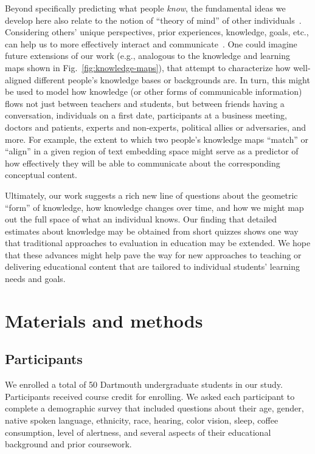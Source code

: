 \documentclass[10pt]{article}
\begin{document}
Beyond specifically predicting what people \textit{know}, the fundamental ideas
we develop here also relate to the notion of ``theory of mind'' of other
individuals~\citep{GoldWinn12, KansEtal15, Melt11}. Considering others' unique
perspectives, prior experiences, knowledge, goals, etc., can help us to more
effectively interact and communicate~\citep{ShaoEtal18, StepBaer06, Ratk18}.
One could imagine future extensions of our work (e.g., analogous to the
knowledge and learning maps shown in Fig.~\ref{fig:knowledge-maps}), that
attempt to characterize how well-aligned different people's knowledge bases or
backgrounds are. In turn, this might be used to model how knowledge (or other
forms of communicable information) flows not just between teachers and
students, but between friends having a conversation, individuals on a first
date, participants at a business meeting, doctors and patients, experts and
non-experts, political allies or adversaries, and more. For example, the extent
to which two people's knowledge maps ``match'' or ``align'' in a given region
of text embedding space might serve as a predictor of how effectively they 
will be able to communicate about the corresponding conceptual content.

Ultimately, our work suggests a rich new line of questions about the geometric
``form'' of knowledge, how knowledge changes over time, and how we might map
out the full space of what an individual knows. Our finding that detailed
estimates about knowledge may be obtained from short quizzes shows one way that
traditional approaches to evaluation in education may be extended. We hope
that these advances might help pave the way for new approaches to teaching or
delivering educational content that are tailored to individual students'
learning needs and goals.

\section*{Materials and methods}

\subsection*{Participants}

We enrolled a total of 50 Dartmouth undergraduate students in our study.
Participants received course credit for enrolling. We asked each participant to
complete a demographic survey that included questions about their age, gender,
native spoken language, ethnicity, race, hearing, color vision, sleep, coffee
consumption, level of alertness, and several aspects of their educational
background and prior coursework.
\end{document}
